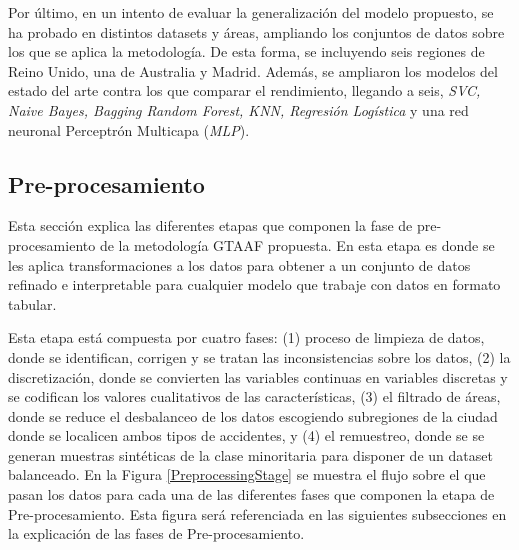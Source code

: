 Por último, en un intento de evaluar la generalización del modelo propuesto, se ha probado en distintos datasets y áreas, ampliando los conjuntos de datos sobre los que se aplica la metodología. De esta forma, se incluyendo seis regiones de Reino Unido, una de Australia y Madrid. Además, se ampliaron los modelos del estado del arte contra los que comparar el rendimiento, llegando a seis, \textit{SVC, Naive Bayes, Bagging Random Forest, KNN, Regresión Logística} y una red neuronal Perceptrón Multicapa (\textit{MLP}).

\subsection{Pre-procesamiento}

Esta sección explica las diferentes etapas que componen la fase de pre-procesamiento de la metodología GTAAF propuesta. En esta etapa es donde se les aplica transformaciones a los datos para obtener a un conjunto de datos refinado e interpretable para cualquier modelo que trabaje con datos en formato tabular. 

Esta etapa está compuesta por cuatro fases: (1) proceso de limpieza de datos, donde se identifican, corrigen y se tratan las inconsistencias sobre los datos, (2) la discretización, donde se convierten las variables continuas en variables discretas y se codifican los valores cualitativos de las características, (3) el filtrado de áreas, donde se reduce el desbalanceo de los datos escogiendo subregiones de la ciudad donde se localicen ambos tipos de accidentes, y (4) el remuestreo, donde se se generan muestras sintéticas de la clase minoritaria para disponer de un dataset balanceado. En la Figura \ref{PreprocessingStage} se muestra el flujo sobre el que pasan los datos para cada una de las diferentes fases que componen la etapa de Pre-procesamiento. Esta figura será referenciada en las siguientes subsecciones en la explicación de las fases de Pre-procesamiento.

